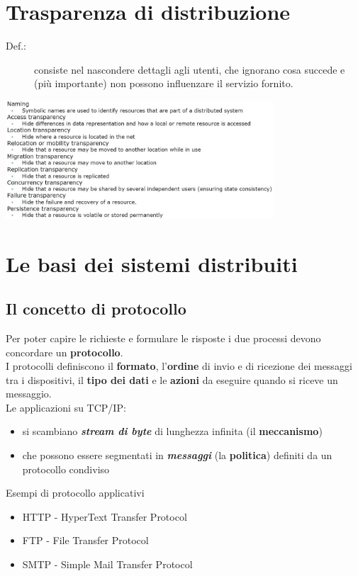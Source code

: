 \section{Trasparenza di distribuzione}
\begin{description}
    \item[Def.:] consiste nel nascondere dettagli agli utenti, che ignorano cosa succede e (più importante) non possono influenzare il servizio fornito. 
\end{description}
\begin{center}
    \includegraphics[width=0.75\textwidth]{img/trasparenza1.jpg}
\end{center}


\section{Le basi dei sistemi distribuiti}
\subsection{Il concetto di protocollo}
Per poter capire le richieste e formulare le risposte i due processi devono concordare un \textbf{protocollo}.
\\I protocolli definiscono il \textbf{formato}, l'\textbf{ordine} di invio e di ricezione dei messaggi tra i dispositivi, il \textbf{tipo dei dati} e le \textbf{azioni} da eseguire quando si riceve un messaggio.
\\Le applicazioni su TCP/IP:
\begin{itemize}
    \item si scambiano \textbf{\textit{stream di byte}} di lunghezza infinita (il \textbf{meccanismo})
    \item che possono essere segmentati in \textbf{\textit{messaggi}} (la \textbf{politica}) definiti da un protocollo condiviso
\end{itemize}
Esempi di protocollo applicativi
\begin{itemize}
    \item HTTP - HyperText Transfer Protocol
    \item FTP - File Transfer Protocol
    \item SMTP - Simple Mail Transfer Protocol
\end{itemize}

